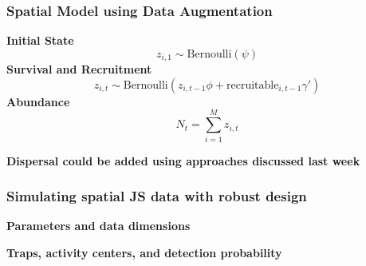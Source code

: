 \documentclass[color=usenames,dvipsnames]{beamer}
\begin{document}
\begin{frame}
  \frametitle{Spatial Model using Data Augmentation}
  {\bf Initial State}
  \[
    z_{i,1} \sim \mbox{Bernoulli}(\psi)
  \]
  \vfill
  {\bf Survival and Recruitment}
  \[
    z_{i,t} \sim \mbox{Bernoulli}(z_{i,t-1}\phi + \mbox{recruitable}_{i,t-1}\gamma')
  \]
  \vfill
  {\bf Abundance}
  \[
    N_t = \sum_{i=1}^M z_{i,t}
  \]
  \pause
  \vfill
  {\centering \bf Dispersal could be added using approaches discussed last week \par}
\end{frame}





\begin{frame}[fragile]
  \frametitle{Simulating spatial JS data with robust design}
  \scriptsize %
  {\bf Parameters and data dimensions}
\begin{knitrout}
\color{fgcolor}\begin{kframe}
\begin{alltt}
 \hlkwb{<-}       
 \hlkwb{<-}        
 \hlkwb{<-}      
 \hlkwb{<-}      
 \hlkwb{<-}    
 \hlkwb{<-}  
 \hlkwb{<-} 
 \hlkwb{<-} 
\end{alltt}
\end{kframe}
\end{knitrout}
\pause
{\bf Traps, activity centers, and detection probability}
\begin{knitrout}
\color{fgcolor}\begin{kframe}
\begin{alltt}
\hlstd{(}\hlstd{)}
 \hlkwb{<-} \hlstd{(}\hlstd{,} \hlstd{,} \hlstd{=}\hlstd{)}
 \hlkwb{<-} \hlstd{(} \hlstd{=}\hlstd{),}  \hlstd{=}\hlstd{))}
 \hlkwb{<-} 
 \hlkwb{<-}  \hlkwb{<-} \hlstd{(}\hlstd{,}\hlstd{)}

\end{alltt}
\end{kframe}
\end{knitrout}
\end{frame}
\end{document}
